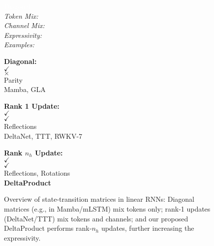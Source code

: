 \begin{figure}[b]
\vspace{-1mm}
\begin{minipage}[b]{0.13\linewidth}
{\footnotesize
    \textcolor{white}{Diagonal}\\
    \textit{Token Mix:} \\
    \textit{Channel Mix:}\\
    \textit{Expressivity:}\\
    \textit{Examples: }}
    \end{minipage}
\begin{minipage}[b]{0.16\linewidth}
{\footnotesize
    \textbf{Diagonal:}\\
    $\checkmark$ \\
    $\times$ \\
    Parity \\
    Mamba, GLA}
    \end{minipage}
\hspace{2.0mm}
\begin{minipage}[b]{0.23\linewidth}
{\footnotesize
    \textbf{Rank 1 Update:}\\
    $\checkmark$ \\
    $\checkmark$ \\
    Reflections \\
    DeltaNet, TTT, RWKV-7}
    \end{minipage}
\hspace{13.5mm}
\begin{minipage}[b]{0.2\linewidth}
{\footnotesize
\textbf{Rank $n_h$ Update:}\\
$\checkmark$ \\
$\checkmark$ \\
Reflections, Rotations \\
\textbf{DeltaProduct}}
\end{minipage}
\vspace{-2mm}
\caption{Overview of state-transition matrices in linear RNNs: Diagonal matrices (e.g., in Mamba/mLSTM) mix tokens only; rank‑1 updates (DeltaNet/TTT) mix tokens and channels; and our proposed DeltaProduct performs rank‑\(n_h\) updates, further increasing the expressivity.}
\label{fig:rank_update_overview}
\end{figure}
